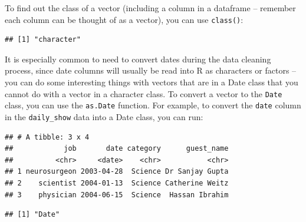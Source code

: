 \documentclass[]{book}
\makeatletter
\newenvironment{Shaded}{\begin{snugshade}}{\end{snugshade}}
\newcommand{\KeywordTok}[1]{\textcolor[rgb]{0.13,0.29,0.53}{\textbf{#1}}}
\newcommand{\DataTypeTok}[1]{\textcolor[rgb]{0.13,0.29,0.53}{#1}}
\newcommand{\DecValTok}[1]{\textcolor[rgb]{0.00,0.00,0.81}{#1}}
\newcommand{\StringTok}[1]{\textcolor[rgb]{0.31,0.60,0.02}{#1}}
\newcommand{\OperatorTok}[1]{\textcolor[rgb]{0.81,0.36,0.00}{\textbf{#1}}}
\newcommand{\NormalTok}[1]{#1}
\newenvironment{kframe}{%
\medskip{}
\setlength{\fboxsep}{.8em}
 \def\at@end@of@kframe{}%
 \ifinner\ifhmode%
  \def\at@end@of@kframe{\end{minipage}}%
  \begin{minipage}{\columnwidth}%
 \fi\fi%
 \def\FrameCommand##1{\hskip\@totalleftmargin \hskip-\fboxsep
 \colorbox{shadecolor}{##1}\hskip-\fboxsep
     \hskip-\linewidth \hskip-\@totalleftmargin \hskip\columnwidth}%
 \MakeFramed {\advance\hsize-\width
   \@totalleftmargin\z@ \linewidth\hsize
   \@setminipage}}%
 {\par\unskip\endMakeFramed%
 \at@end@of@kframe}
\renewenvironment{Shaded}{\begin{kframe}}{\end{kframe}}
\theoremstyle{definition}
\theoremstyle{definition}
\theoremstyle{definition}
\theoremstyle{remark}
\makeatother
\begin{document}
To find out the class of a vector (including a column in a dataframe --
remember each column can be thought of as a vector), you can use
\texttt{class()}:

\begin{Shaded}
\end{Shaded}

\begin{verbatim}
## [1] "character"
\end{verbatim}

It is especially common to need to convert dates during the data
cleaning process, since date columns will usually be read into R as
characters or factors -- you can do some interesting things with vectors
that are in a Date class that you cannot do with a vector in a character
class. To convert a vector to the \texttt{Date} class, you can use the
\texttt{as.Date} function. For example, to convert the \texttt{date}
column in the \texttt{daily\_show} data into a Date class, you can run:

\begin{Shaded}
\end{Shaded}

\begin{verbatim}
## # A tibble: 3 x 4
##            job       date category      guest_name
##          <chr>     <date>    <chr>           <chr>
## 1 neurosurgeon 2003-04-28  Science Dr Sanjay Gupta
## 2    scientist 2004-01-13  Science Catherine Weitz
## 3    physician 2004-06-15  Science  Hassan Ibrahim
\end{verbatim}

\begin{Shaded}
\end{Shaded}

\begin{verbatim}
## [1] "Date"
\end{verbatim}
\end{document}
